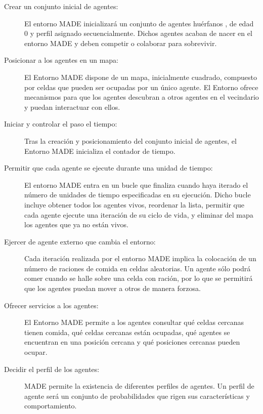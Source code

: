 \begin{description}
   \item[Crear un conjunto inicial de agentes:] 

 	El entorno MADE inicializará un conjunto de agentes huérfanos , de edad 0 y perfil asignado secuencialmente. Dichos agentes acaban de nacer en el entorno MADE y deben competir o colaborar para sobrevivir.
   
   \item[Posicionar a los agentes en un mapa:] El Entorno MADE dispone de un mapa, inicialmente cuadrado, compuesto por celdas que pueden ser ocupadas por un único agente. El Entorno ofrece mecanismos para que los agentes descubran a otros agentes en el vecindario y puedan interactuar con ellos.
   
   \item[Iniciar y controlar el paso el tiempo:] Tras la creación y posicionamiento del conjunto inicial de agentes, el Entorno MADE inicializa el contador de tiempo.
   
   \item[Permitir que cada agente se ejecute durante una unidad de tiempo:] El entorno MADE entra en un bucle que finaliza cuando haya iterado el número de unidades de tiempo especificadas en su ejecución. Dicho bucle incluye obtener todos los agentes vivos, reordenar la lista, permitir que cada agente ejecute una iteración de su  ciclo de vida, y eliminar del mapa los agentes que ya no están vivos. 
   
   \item[Ejercer de agente externo que cambia el entorno:] Cada iteración realizada por el entorno MADE implica la colocación de un número de raciones de comida en celdas aleatorias. Un agente sólo podrá comer cuando se halle sobre una celda con ración, por lo que se permitirá que los agentes puedan mover a otros de manera forzosa.
    
   \item[Ofrecer servicios a los agentes:] El Entorno MADE permite a los agentes consultar qué celdas cercanas tienen comida, qué celdas cercanas están ocupadas, qué agentes se encuentran en una posición cercana y qué posiciones cercanas pueden ocupar.
   
   \item[Decidir el perfil de los agentes:] MADE permite la existencia de diferentes perfiles de agentes. Un perfil de agente será un conjunto de probabilidades que rigen sus características y comportamiento.
   
\end{description}



